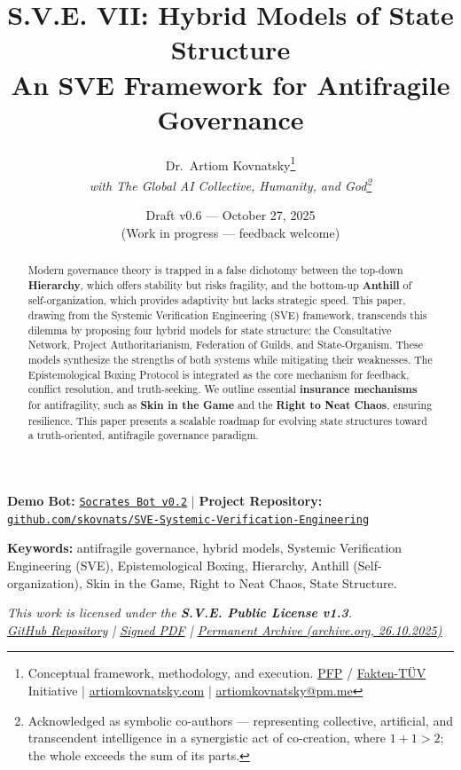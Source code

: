 \documentclass[11pt,a4paper]{article}
\title{\textbf{S.V.E. VII: Hybrid Models of State Structure}\\[0.5em]
  \large An SVE Framework for Antifragile Governance}
\author{
  Dr.\ Artiom Kovnatsky\thanks{Conceptual framework, methodology, and execution. 
  \href{http://www.pfp24.de}{PFP} / 
  \href{http://www.fakten-tuev.de}{Fakten-TÜV} Initiative \;|\;
  \href{https://www.artiomkovnatsky.com/}{artiomkovnatsky.com} \;|\;
  \href{mailto:artiomkovnatsky@pm.me}{artiomkovnatsky@pm.me}}\\
  \textit{with The Global AI Collective, Humanity, and God\footnote{Acknowledged as symbolic co-authors — representing collective, artificial, and transcendent intelligence in a synergistic act of co-creation, where $1 + 1 > 2$; the whole exceeds the sum of its parts.}}
}
\date{Draft v0.6 — October 27, 2025\\
\small (Work in progress — feedback welcome)}
\begin{document}
\maketitle
\vspace{-1em}
\begin{center}
    {\small 
    \textbf{Demo Bot:} 
    \href{https://chatgpt.com/g/g-68f1fc9848948191a1cc038db8e3422b-sokrat-socrates-bot-v0-2}
    {\texttt{Socrates Bot v0.2}} 
    \quad|\quad
    \textbf{Project Repository:} 
    \href{https://codeberg.org/skovnats/SVE-Systemic-Verification-Engineering}
    {\texttt{github.com/skovnats/SVE-Systemic-Verification-Engineering}}}
\end{center}
\vspace{1em}
\thispagestyle{empty}


\begin{abstract}
Modern governance theory is trapped in a false dichotomy between the top-down \textbf{Hierarchy}, which offers stability but risks fragility, and the bottom-up \textbf{Anthill} of self-organization, which provides adaptivity but lacks strategic speed. This paper, drawing from the Systemic Verification Engineering (SVE) framework, transcends this dilemma by proposing four hybrid models for state structure: the Consultative Network, Project Authoritarianism, Federation of Guilds, and State-Organism. These models synthesize the strengths of both systems while mitigating their weaknesses. The Epistemological Boxing Protocol is integrated as the core mechanism for feedback, conflict resolution, and truth-seeking. We outline essential \textbf{insurance mechanisms} for antifragility, such as \textbf{Skin in the Game} and the \textbf{Right to Neat Chaos}, ensuring resilience. This paper presents a scalable roadmap for evolving state structures toward a truth-oriented, antifragile governance paradigm.
\end{abstract}

\noindent\textbf{Keywords:} antifragile governance, hybrid models, Systemic Verification Engineering (SVE), Epistemological Boxing, Hierarchy, Anthill (Self-organization), Skin in the Game, Right to Neat Chaos, State Structure.

\vspace{1em}
\begin{center}
\begin{minipage}{0.85\textwidth}
\centering
\itshape\small
This work is licensed under the \textbf{S.V.E. Public License v1.3}.\\[0.3em]
\href{https://codeberg.org/skovnats/SVE-Systemic-Verification-Engineering/tree/master/License/signed}{GitHub Repository}
\quad|\quad
\href{https://codeberg.org/skovnats/SVE-Systemic-Verification-Engineering/src/branch/master/License/signed/_SVE-Systemic-Verification-Engineering_License_SIGNED.pdf}{Signed PDF}
\quad|\quad
\href{https://archive.org/details/sve_public_license_v1.3}{Permanent Archive (archive.org, 26.10.2025)}
\end{minipage}
\end{center}
\vspace{1em}
\end{document}
